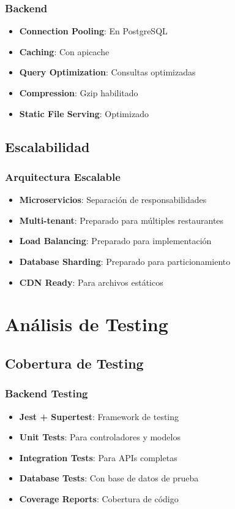 \documentclass[12pt,a4paper]{article}
\begin{document}
\subsubsection{Backend}
\begin{itemize}
    \item \textbf{Connection Pooling}: En PostgreSQL
    \item \textbf{Caching}: Con apicache
    \item \textbf{Query Optimization}: Consultas optimizadas
    \item \textbf{Compression}: Gzip habilitado
    \item \textbf{Static File Serving}: Optimizado
\end{itemize}

\subsection{Escalabilidad}

\subsubsection{Arquitectura Escalable}
\begin{itemize}
    \item \textbf{Microservicios}: Separación de responsabilidades
    \item \textbf{Multi-tenant}: Preparado para múltiples restaurantes
    \item \textbf{Load Balancing}: Preparado para implementación
    \item \textbf{Database Sharding}: Preparado para particionamiento
    \item \textbf{CDN Ready}: Para archivos estáticos
\end{itemize}

\section{Análisis de Testing}

\subsection{Cobertura de Testing}

\subsubsection{Backend Testing}
\begin{itemize}
    \item \textbf{Jest + Supertest}: Framework de testing
    \item \textbf{Unit Tests}: Para controladores y modelos
    \item \textbf{Integration Tests}: Para APIs completas
    \item \textbf{Database Tests}: Con base de datos de prueba
    \item \textbf{Coverage Reports}: Cobertura de código
\end{itemize}
\end{document}
